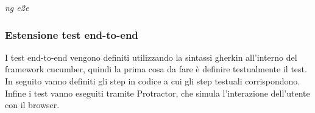 \documentclass[../manuale-manutentore.tex]{subfiles}
\begin{document}
\begin{center}
  \textit{ng e2e}
\end{center}
\par\bigskip

\subsubsection{Estensione test end-to-end}%
\label{subs:estensione_test_end_to_end}
I test end-to-end vengono definiti utilizzando la sintassi gherkin all'interno del framework cucumber, quindi la prima cosa da fare è definire testualmente il test.
In seguito vanno definiti gli step in codice a cui gli step testuali corrispondono.
Infine i test vanno eseguiti tramite Protractor, che simula l'interazione dell'utente con il browser.
\end{document}
